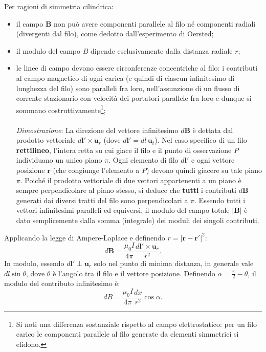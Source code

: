 \documentclass[a4paper,11pt]{report}
\begin{document}
Per ragioni di simmetria cilindrica:
\begin{itemize}
    \item il campo $\bm{B}$ non può avere componenti parallele al filo né componenti radiali (divergenti dal filo), come dedotto dall'esperimento di Oersted;
    \item il modulo del campo $B$ dipende esclusivamente dalla distanza radiale $r$;
    \item le linee di campo devono essere circonferenze concentriche al filo: i contributi al campo magnetico di ogni carica (e quindi di ciascun infinitesimo di lunghezza del filo) sono paralleli fra loro, nell'assunzione di un flusso di corrente stazionario con velocità dei portatori parallele fra loro e dunque si sommano costruttivamente\footnote{Si noti una differenza sostanziale rispetto al campo elettrostatico: per un filo carico le componenti parallele al filo generate da elementi simmetrici si elidono.}; \\
    \\
\textit{Dimostrazione}: La direzione del vettore infinitesimo $d\bm{B}$ è dettata dal prodotto vettoriale $d\bm{l}' \times \bm{u}_r$ (dove $d\bm{l}' = dl\,\bm{u}_t$).
Nel caso specifico di un filo \textbf{rettilineo}, l'intera retta su cui giace il filo e il punto di osservazione $P$ individuano un unico piano $\pi$. Ogni elemento di filo $d\bm{l}'$ e ogni vettore posizione $\bm{r}$ (che congiunge l'elemento a $P$) devono quindi giacere su tale piano $\pi$. Poiché il prodotto vettoriale di due vettori appartenenti a un piano è sempre perpendicolare al piano stesso, si deduce che \textbf{tutti} i contributi $d\bm{B}$ generati dai diversi tratti del filo sono perpendicolari a $\pi$.
Essendo tutti i vettori infinitesimi paralleli ed equiversi, il modulo del campo totale $|\bm{B}|$ è dato semplicemente dalla somma (integrale) dei moduli dei singoli contributi.
    

\end{itemize}
Applicando la legge di Ampere-Laplace e definendo $r = |\bm{r}-\bm{r}'|^2$:
\begin{equation}
    d\bm{B} = \frac{\mu_0 I}{4\pi} \frac{d\bm{l}' \times \bm{u}_r}{r^2}.
\end{equation}
In modulo, essendo $d\bm{l}' \perp \bm{u}_r$ solo nel punto di minima distanza, in generale vale $dl \sin\theta$, dove $\theta$ è l'angolo tra il filo e il vettore posizione. Definendo $\alpha = \frac{\pi}{2} - \theta$, il modulo del contributo infinitesimo è:
\begin{equation}
    dB = \frac{\mu_0 I}{4\pi} \frac{dx}{r^2} \cos\alpha.
\end{equation}
\end{document}
